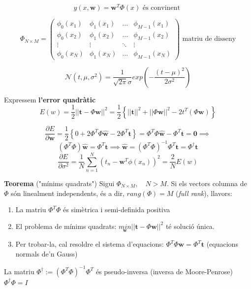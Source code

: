 \documentclass[a4paper]{article}
\begin{document}
$$
\boxed{y(x, \boldsymbol{w}) = \boldsymbol{w}^T \Phi(x)} \text{ és convinent }
$$

$$
\Phi_{N \times M} =
\begin{pmatrix}
\phi_0 (x_1) & \phi_1(x_1) & \ldots & \phi_{M-1} (x_1) \\
\phi_0 (x_2) & \phi_1(x_2) & \ldots & \phi_{M-1} (x_2) \\
\vdots & \vdots & \ddots & \vdots \\
\phi_0 (x_N) & \phi_1(x_N) & \ldots & \phi_{M-1} (x_N)
\end{pmatrix}
\text{ matriu de disseny}
$$

$$
\mathcal{N}(t, \mu, \sigma^2) = \frac{1}{\sqrt{2 \pi} \sigma} exp \left( - \frac{(t - \mu)^2}{2\sigma^2} \right)
$$

Expressem \textbf{l'error quadràtic}
$$
E(w) = \frac{1}{2} || \boldsymbol{t} - \Phi \boldsymbol{w} ||^2 = \frac{1}{2} \left\{ ||\boldsymbol{t}||^2 + ||\Phi \boldsymbol{w}||^2 - 2t^T(\Phi \boldsymbol{w}) \right\}
$$

$$
\frac{\partial E}{\partial \boldsymbol{w}} = \frac{1}{2} \left\{ 0 + 2 \Phi^T \Phi \hat{\boldsymbol{w}} - 2 \Phi^T \boldsymbol{t} \right\} = \Phi^T \Phi \hat{\boldsymbol{w}} - \Phi^T \boldsymbol{t} = \boldsymbol{0} \implies
$$
$$
\left( \Phi^T \Phi \right) \hat{\boldsymbol{w}} = \Phi^T \boldsymbol{t} \implies
\boxed{\hat{\boldsymbol{w}} = (\Phi^T \Phi)^{-1} \Phi^T \boldsymbol{t}} =
\Phi^{\dag} \boldsymbol{t}
$$
$$
\frac{\partial E}{\partial \sigma^2} = \frac{1}{N} \sum_{n=1}^N (t_n - \boldsymbol{w}^T \phi(x_n))^2 = \frac{2}{N} E(w)
$$

\textbf{Teorema} ("mínims quadrats")
Sigui $\Phi_{N\times M}, \quad N > M$. Si els vectors columna de $\Phi$ són linealment independents, és a dir, $rang(\Phi) = M$ (\emph{full rank}), llavors:

\begin{enumerate}
	\item La matriu $\Phi^T\Phi$ és simètrica i semi-definida positiva
	\item El problema de mínims quadrats: 
	$\underset{\boldsymbol{w}}{min} ||\boldsymbol{t} - \Phi \boldsymbol{w}||^2$ té solució única.
	\item Per trobar-la, cal resoldre el sistema d'equacions: $\Phi^T\Phi \boldsymbol{w} = \Phi^T \boldsymbol{t}$ (equacions normals de'n Gauss)
\end{enumerate}

La matriu $ \Phi^{\dag} := \left( \Phi^T \Phi \right)^{-1} \Phi^T $ és pseudo-inversa (inversa de Moore-Penrose) $ \Phi^{\dag} \Phi = I $
\end{document}
